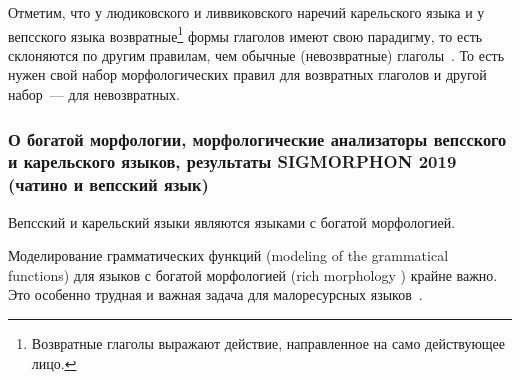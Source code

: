 Отметим, что у людиковского и ливвиковского наречий карельского языка 
и у вепсского языка 
возвратные\footnote{Возвратные глаголы выражают действие, направленное на само действующее лицо.}
формы глаголов имеют свою парадигму, 
то есть склоняются по другим правилам, чем обычные (невозвратные) глаголы~\cite[268]{Novak2019Grammar}. 
То есть нужен свой набор морфологических правил для возвратных глаголов 
и другой набор~--- для невозвратных.

\newpage

\subsubsection{О богатой морфологии, морфологические анализаторы вепсского и карельского языков, результаты SIGMORPHON 2019 (чатино и вепсский язык)}

Вепсский и карельский языки являются языками с богатой морфологией.

Моделирование грамматических функций (modeling of the grammatical functions)
для языков с богатой морфологией (rich morphology
) крайне важно.
Это особенно трудная и важная задача
для малоресурсных языков~\cite[2820]{Cruz-Anastasopoulos-Stump2020Chatino}.


